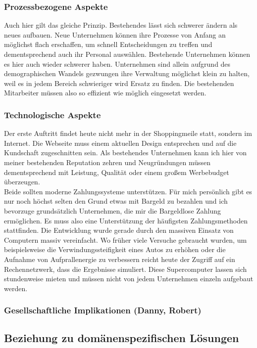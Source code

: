 \documentclass[notitlepage, hidelinks]{article}
\begin{document}
\subsubsection{Prozessbezogene Aspekte}
Auch hier gilt das gleiche Prinzip. Bestehendes lässt sich schwerer ändern als neues aufbauen. Neue Unternehmen können ihre Prozesse von Anfang an möglichst flach erschaffen, um schnell Entscheidungen zu treffen und dementsprechend auch ihr Personal auswählen. Bestehende Unternehmen können es hier auch wieder schwerer haben. Unternehmen sind allein aufgrund des demographischen Wandels gezwungen ihre Verwaltung möglichst klein zu halten, weil es in jedem Bereich schwieriger wird Ersatz zu finden. Die bestehenden Mitarbeiter müssen also so effizient wie möglich eingesetzt werden.

\subsubsection{Technologische Aspekte}
Der erste Auftritt findet heute nicht mehr in der Shoppingmeile statt, sondern im Internet. Die Webseite muss einem aktuellen Design entsprechen und auf die Kundschaft zugeschnitten sein. Als bestehendes Unternehmen kann ich hier von meiner bestehenden Reputation zehren und Neugründungen müssen dementsprechend mit Leistung, Qualität oder einem großem Werbebudget überzeugen. \\
Beide sollten moderne Zahlungssysteme unterstützen. Für mich persönlich gibt es nur noch höchst selten den Grund etwas mit Bargeld zu bezahlen und ich bevorzuge grundsätzlich Unternehmen, die mir die Bargeldlose Zahlung ermöglichen. Es muss also eine Unterstützung der häufigsten Zahlungsmethoden stattfinden. 
Die Entwicklung wurde gerade durch den massiven Einsatz von Computern massiv vereinfacht. Wo früher viele Versuche gebraucht wurden, um beispielsweise die Verwindungssteifigkeit eines Autos zu erhöhen oder die Aufnahme von Aufprallenergie  zu verbessern reicht heute der Zugriff auf ein Rechennetzwerk, dass die Ergebnisse simuliert. Diese Supercomputer lassen sich stundenweise mieten und müssen nicht von jedem Unternehmen einzeln aufgebaut werden.

\subsubsection{Gesellschaftliche Implikationen (Danny, Robert)}


\subsection{Beziehung zu domänenspezifischen Lösungen}
\end{document}
